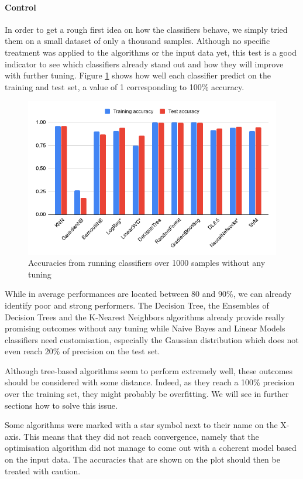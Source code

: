 \paragraph{Control}
In order to get a rough first idea on how the classifiers behave, we simply tried them on a small dataset of only a thousand samples. Although no specific treatment was applied to the algorithms or the input data yet, this test is a good indicator to see which classifiers already stand out and how they will improve with further tuning. Figure \ref{fig:control} shows how well each classifier predict on the training and test set, a value of 1 corresponding to 100\% accuracy.
\begin{figure}[!ht]
  \includegraphics[width=\linewidth]{Figures/control.png}
  \captionsetup{justification=centering}
  \caption{Accuracies from running classifiers over 1000 samples without any tuning}
  \label{fig:control}
\end{figure}

While in average performances are located between 80 and 90\%, we can already identify poor and strong performers. The Decision Tree, the Ensembles of Decision Trees and the K-Nearest Neighbors algorithms already provide really promising outcomes without any tuning while Naive Bayes and Linear Models classifiers need customisation, especially the Gaussian distribution which does not even reach 20\% of precision on the test set.

Although tree-based algorithms seem to perform extremely well, these outcomes should be considered with some distance. Indeed, as they reach a 100\% precision over the training set, they might probably be overfitting. We will see in further sections how to solve this issue.

Some algorithms were marked with a star symbol next to their name on the X-axis. This means that they did not reach convergence, namely that the optimisation algorithm did not manage to come out with a coherent model based on the input data. The accuracies that are shown on the plot should then be treated with caution.

